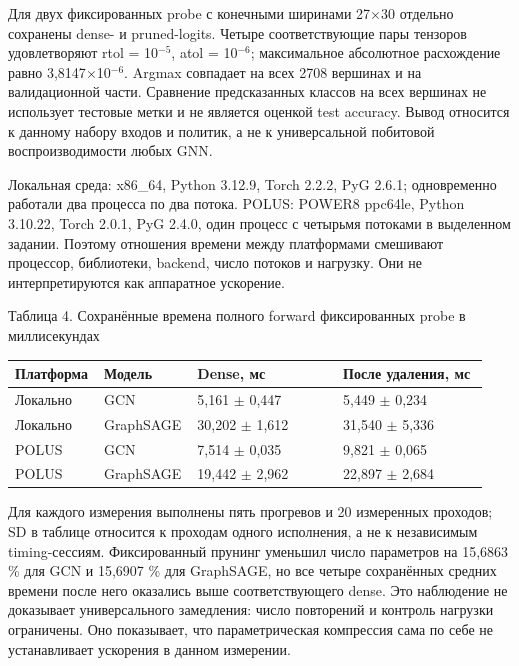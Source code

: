 \documentclass[10pt,a4paper]{article}
\begin{document}
Для двух фиксированных probe с конечными ширинами 27$\times$30 отдельно сохранены dense- и pruned-logits. Четыре соответствующие пары тензоров удовлетворяют rtol = 10$^{-5}$, atol = 10$^{-6}$; максимальное абсолютное расхождение равно 3,8147$\times$10$^{-6}$. Argmax совпадает на всех 2708 вершинах и на валидационной части. Сравнение предсказанных классов на всех вершинах не использует тестовые метки и не является оценкой test accuracy. Вывод относится к данному набору входов и политик, а не к универсальной побитовой воспроизводимости любых GNN.

Локальная среда: x86\_64, Python 3.12.9, Torch 2.2.2, PyG 2.6.1; одновременно работали два процесса по два потока. POLUS: POWER8 ppc64le, Python 3.10.22, Torch 2.0.1, PyG 2.4.0, один процесс с четырьмя потоками в выделенном задании. Поэтому отношения времени между платформами смешивают процессор, библиотеки, backend, число потоков и нагрузку. Они не интерпретируются как аппаратное ускорение.

\par\medskip\noindent Таблица 4. Сохранённые времена полного forward фиксированных probe в миллисекундах\par
\begingroup\setlength{\tabcolsep}{2pt}\renewcommand{\arraystretch}{1.12}
\begin{longtable}{p{0.166\linewidth}p{0.166\linewidth}p{0.304\linewidth}p{0.304\linewidth}}
\toprule
Платформа & Модель & Dense, мс & После удаления, мс\\ \midrule\endhead
Локально & GCN & 5,161 $\pm$ 0,447 & 5,449 $\pm$ 0,234\\
Локально & GraphSAGE & 30,202 $\pm$ 1,612 & 31,540 $\pm$ 5,336\\
POLUS & GCN & 7,514 $\pm$ 0,035 & 9,821 $\pm$ 0,065\\
POLUS & GraphSAGE & 19,442 $\pm$ 2,962 & 22,897 $\pm$ 2,684\\
\bottomrule\end{longtable}\endgroup
Для каждого измерения выполнены пять прогревов и 20 измеренных проходов; SD в таблице относится к проходам одного исполнения, а не к независимым timing-сессиям. Фиксированный прунинг уменьшил число параметров на 15,6863 \% для GCN и 15,6907 \% для GraphSAGE, но все четыре сохранённых средних времени после него оказались выше соответствующего dense. Это наблюдение не доказывает универсального замедления: число повторений и контроль нагрузки ограничены. Оно показывает, что параметрическая компрессия сама по себе не устанавливает ускорения в данном измерении.
\end{document}
